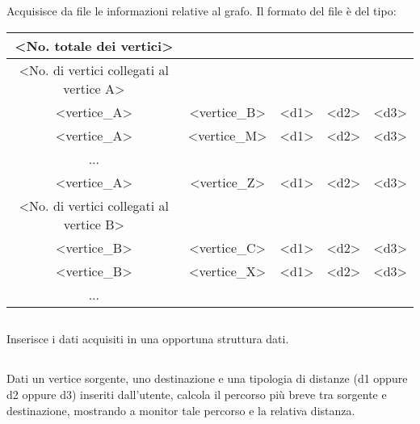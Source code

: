 \documentclass[11pt, a4paper, titlepage, block]{article}
\begin{document}
	\subsection{}
	Acquisisce da file le informazioni relative al grafo. Il formato del file \`{e} del tipo:\\
	\begin{tabular}{|c|c|c|c|c|}
\hline
	{\textless}No. totale dei vertici{\textgreater} & & & & \\
\hline
	{\textless}No. di vertici collegati al vertice A{\textgreater} & & & & \\
\hline
	{\textless}vertice\_A{\textgreater} & {\textless}vertice\_B{\textgreater} & {\textless}d1{\textgreater} & {\textless}d2{\textgreater} & {\textless}d3{\textgreater}\\
\hline
	{\textless}vertice\_A{\textgreater} & {\textless}vertice\_M{\textgreater} & {\textless}d1{\textgreater} & {\textless}d2{\textgreater} & {\textless}d3{\textgreater}\\
\hline
	... & & & &\\
\hline
	{\textless}vertice\_A{\textgreater} & {\textless}vertice\_Z{\textgreater} & {\textless}d1{\textgreater} & {\textless}d2{\textgreater} & {\textless}d3{\textgreater}\\
\hline
	{\textless}No. di vertici collegati al vertice B{\textgreater} & & & &\\
\hline
	{\textless}vertice\_B{\textgreater} & {\textless}vertice\_C{\textgreater} & {\textless}d1{\textgreater} & {\textless}d2{\textgreater} & {\textless}d3{\textgreater}\\
\hline
	{\textless}vertice\_B{\textgreater} & {\textless}vertice\_X{\textgreater} & {\textless}d1{\textgreater} & {\textless}d2{\textgreater} & {\textless}d3{\textgreater}\\
\hline
	... & & & &\\
\hline
\end{tabular}
	\subsection{}
	Inserisce i dati acquisiti in una opportuna struttura dati.
	\subsection{}
	Dati un vertice sorgente, uno destinazione e una tipologia di distanze (d1 oppure d2 oppure d3) inseriti dall’utente, calcola il percorso pi\`{u} breve tra sorgente e destinazione, mostrando a
monitor tale percorso e la relativa distanza.
\end{document}
